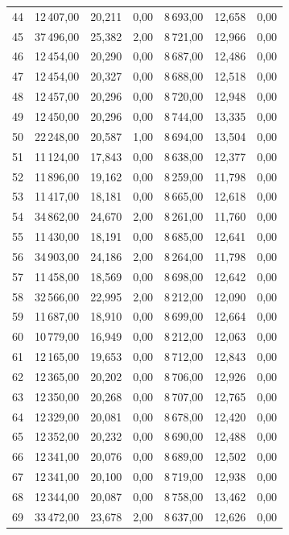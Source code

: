 \begin{longtable}{lrrrrrr}
44 & 12\,407,00 & 20,211 & 0,00 & 8\,693,00 & 12,658 & 0,00 \\
45 & 37\,496,00 & 25,382 & 2,00 & 8\,721,00 & 12,966 & 0,00 \\
46 & 12\,454,00 & 20,290 & 0,00 & 8\,687,00 & 12,486 & 0,00 \\
47 & 12\,454,00 & 20,327 & 0,00 & 8\,688,00 & 12,518 & 0,00 \\
48 & 12\,457,00 & 20,296 & 0,00 & 8\,720,00 & 12,948 & 0,00 \\
49 & 12\,450,00 & 20,296 & 0,00 & 8\,744,00 & 13,335 & 0,00 \\
50 & 22\,248,00 & 20,587 & 1,00 & 8\,694,00 & 13,504 & 0,00 \\
51 & 11\,124,00 & 17,843 & 0,00 & 8\,638,00 & 12,377 & 0,00 \\
52 & 11\,896,00 & 19,162 & 0,00 & 8\,259,00 & 11,798 & 0,00 \\
53 & 11\,417,00 & 18,181 & 0,00 & 8\,665,00 & 12,618 & 0,00 \\
54 & 34\,862,00 & 24,670 & 2,00 & 8\,261,00 & 11,760 & 0,00 \\
55 & 11\,430,00 & 18,191 & 0,00 & 8\,685,00 & 12,641 & 0,00 \\
56 & 34\,903,00 & 24,186 & 2,00 & 8\,264,00 & 11,798 & 0,00 \\
57 & 11\,458,00 & 18,569 & 0,00 & 8\,698,00 & 12,642 & 0,00 \\
58 & 32\,566,00 & 22,995 & 2,00 & 8\,212,00 & 12,090 & 0,00 \\
59 & 11\,687,00 & 18,910 & 0,00 & 8\,699,00 & 12,664 & 0,00 \\
60 & 10\,779,00 & 16,949 & 0,00 & 8\,212,00 & 12,063 & 0,00 \\
61 & 12\,165,00 & 19,653 & 0,00 & 8\,712,00 & 12,843 & 0,00 \\
62 & 12\,365,00 & 20,202 & 0,00 & 8\,706,00 & 12,926 & 0,00 \\
63 & 12\,350,00 & 20,268 & 0,00 & 8\,707,00 & 12,765 & 0,00 \\
64 & 12\,329,00 & 20,081 & 0,00 & 8\,678,00 & 12,420 & 0,00 \\
65 & 12\,352,00 & 20,232 & 0,00 & 8\,690,00 & 12,488 & 0,00 \\
66 & 12\,341,00 & 20,076 & 0,00 & 8\,689,00 & 12,502 & 0,00 \\
67 & 12\,341,00 & 20,100 & 0,00 & 8\,719,00 & 12,938 & 0,00 \\
68 & 12\,344,00 & 20,087 & 0,00 & 8\,758,00 & 13,462 & 0,00 \\
69 & 33\,472,00 & 23,678 & 2,00 & 8\,637,00 & 12,626 & 0,00 \\

\end{longtable}

